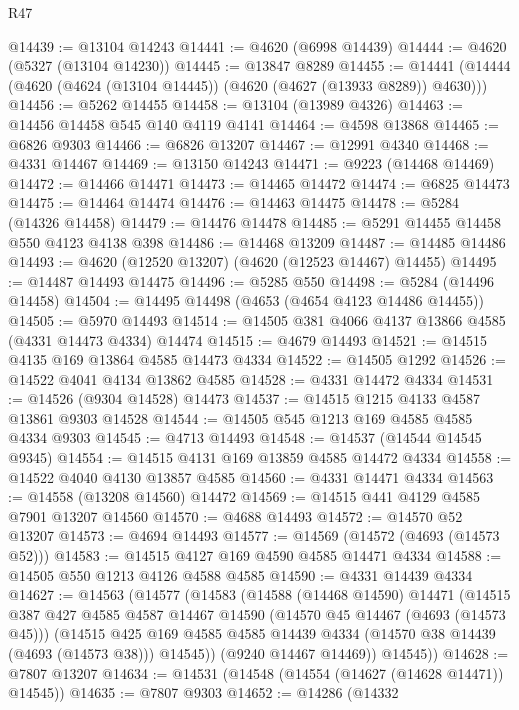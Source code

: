 \begin{lexlean}{R47}
\begin{coremodule}
@14439 := @13104 @14243
@14441 := @4620 (@6998 @14439)
@14444 := @4620 (@5327 (@13104 @14230))
@14445 := @13847 @8289
@14455 := @14441 (@14444 (@4620 (@4624 (@13104 @14445)) (@4620 (@4627 (@13933 @8289)) @4630)))
@14456 := @5262 @14455
@14458 := @13104 (@13989 @4326)
@14463 := @14456 @14458 @545 @140 @4119 @4141
@14464 := @4598 @13868
@14465 := @6826 @9303
@14466 := @6826 @13207
@14467 := @12991 @4340
@14468 := @4331 @14467
@14469 := @13150 @14243
@14471 := @9223 (@14468 @14469)
@14472 := @14466 @14471
@14473 := @14465 @14472
@14474 := @6825 @14473
@14475 := @14464 @14474
@14476 := @14463 @14475
@14478 := @5284 (@14326 @14458)
@14479 := @14476 @14478
@14485 := @5291 @14455 @14458 @550 @4123 @4138 @398
@14486 := @14468 @13209
@14487 := @14485 @14486
@14493 := @4620 (@12520 @13207) (@4620 (@12523 @14467) @14455)
@14495 := @14487 @14493 @14475
@14496 := @5285 @550
@14498 := @5284 (@14496 @14458)
@14504 := @14495 @14498 (@4653 (@4654 @4123 @14486 @14455))
@14505 := @5970 @14493
@14514 := @14505 @381 @4066 @4137 @13866 @4585 (@4331 @14473 @4334) @14474
@14515 := @4679 @14493
@14521 := @14515 @4135 @169 @13864 @4585 @14473 @4334
@14522 := @14505 @1292
@14526 := @14522 @4041 @4134 @13862 @4585
@14528 := @4331 @14472 @4334
@14531 := @14526 (@9304 @14528) @14473
@14537 := @14515 @1215 @4133 @4587 @13861 @9303 @14528
@14544 := @14505 @545 @1213 @169 @4585 @4585 @4334 @9303
@14545 := @4713 @14493
@14548 := @14537 (@14544 @14545 @9345)
@14554 := @14515 @4131 @169 @13859 @4585 @14472 @4334
@14558 := @14522 @4040 @4130 @13857 @4585
@14560 := @4331 @14471 @4334
@14563 := @14558 (@13208 @14560) @14472
@14569 := @14515 @441 @4129 @4585 @7901 @13207 @14560
@14570 := @4688 @14493
@14572 := @14570 @52 @13207
@14573 := @4694 @14493
@14577 := @14569 (@14572 (@4693 (@14573 @52)))
@14583 := @14515 @4127 @169 @4590 @4585 @14471 @4334
@14588 := @14505 @550 @1213 @4126 @4588 @4585
@14590 := @4331 @14439 @4334
@14627 := @14563
    (@14577
      (@14583
        (@14588
          (@14468 @14590)
          @14471
          (@14515
            @387
            @427
            @4585
            @4587
            @14467
            @14590
            (@14570 @45 @14467 (@4693 (@14573 @45)))
            (@14515
              @425
              @169
              @4585
              @4585
              @14439
              @4334
              (@14570 @38 @14439 (@4693 (@14573 @38)))
              @14545))
          (@9240 @14467 @14469))
        @14545))
@14628 := @7807 @13207
@14634 := @14531 (@14548 (@14554 (@14627 (@14628 @14471)) @14545))
@14635 := @7807 @9303
@14652 := @14286
    (@14332

\end{coremodule}
\end{lexlean}
